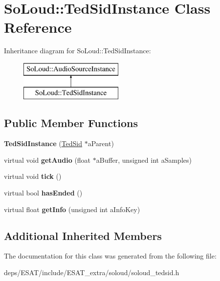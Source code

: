\hypertarget{class_so_loud_1_1_ted_sid_instance}{}\section{So\+Loud\+:\+:Ted\+Sid\+Instance Class Reference}
\label{class_so_loud_1_1_ted_sid_instance}
Inheritance diagram for So\+Loud\+:\+:Ted\+Sid\+Instance\+:\begin{figure}[H]
\begin{center}
\leavevmode
\includegraphics[height=2.000000cm]{class_so_loud_1_1_ted_sid_instance}
\end{center}
\end{figure}
\subsection*{Public Member Functions}
\begin{DoxyCompactItemize}
\item 
\mbox{\label{class_so_loud_1_1_ted_sid_instance_a7bd55aaf5d486b3321742dc2f2da9873}} 
{\bfseries Ted\+Sid\+Instance} (\mbox{\hyperlink{class_so_loud_1_1_ted_sid}{Ted\+Sid}} $\ast$a\+Parent)
\item 
\mbox{\label{class_so_loud_1_1_ted_sid_instance_ae5fa055ffe1872d0f1cba6aae8184820}} 
virtual void {\bfseries get\+Audio} (float $\ast$a\+Buffer, unsigned int a\+Samples)
\item 
\mbox{\label{class_so_loud_1_1_ted_sid_instance_a75a166390b51bedfb6e6f81b6185604d}} 
virtual void {\bfseries tick} ()
\item 
\mbox{\label{class_so_loud_1_1_ted_sid_instance_a471e0e7bdc75af44f7cdbce71a167671}} 
virtual bool {\bfseries has\+Ended} ()
\item 
\mbox{\label{class_so_loud_1_1_ted_sid_instance_a95ec8137ecbd2269147ecb19a02822c6}} 
virtual float {\bfseries get\+Info} (unsigned int a\+Info\+Key)
\end{DoxyCompactItemize}
\subsection*{Additional Inherited Members}


The documentation for this class was generated from the following file\+:\begin{DoxyCompactItemize}
\item 
deps/\+E\+S\+A\+T/include/\+E\+S\+A\+T\+\_\+extra/soloud/soloud\+\_\+tedsid.\+h\end{DoxyCompactItemize}
